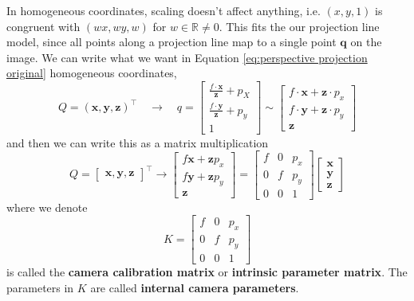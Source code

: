 \documentclass[11pt]{article}
\newcommand{\bq}{\mathbf{q}}
\newcommand{\bx}{\mathbf{x}}
\newcommand{\by}{\mathbf{y}}
\newcommand{\bz}{\mathbf{z}}
\newcommand{\real}{\mathbb{R}}
\begin{document}
In homogeneous coordinates, scaling doesn't affect anything, i.e. $(x, y, 1)$ is congruent with $(wx, wy, w)$ for $w\in\real \neq 0$. This fits the our projection line model, since all points along a projection line map to a single point $\bq$ on the image. We can write what we want in Equation \ref{eq:perspective projection original} homogeneous coordinates, 
\begin{equation}
	Q=(\bx, \by, \bz)^{\top} \quad \rightarrow \quad q=\left[\begin{array}{c}
		\frac{f \cdot \bx}{\bz} + p_{X} \\
		\frac{f \cdot \by}{\bz} + p_{y} \\
		1
		\end{array}\right] \sim\left[\begin{array}{c}
		f \cdot \bx + \bz \cdot p_{x} \\
		f \cdot \by + \bz \cdot p_{y} \\
		\bz
	\end{array}\right]
\end{equation}
and then we can write this as a matrix multiplication
\begin{equation}
	Q = \begin{bmatrix}
		\bx, \by, \bz
	\end{bmatrix}^\top \rightarrow 
	\begin{bmatrix}
		f\bx + \bz p_x \\
		f\by + \bz p_y \\
		\bz
	\end{bmatrix} = \begin{bmatrix}
		f & 0 & p_x \\
		0 & f & p_y \\
		0 & 0 & 1
	\end{bmatrix} \begin{bmatrix}
		\bx \\ \by \\ \bz
	\end{bmatrix}
\end{equation}
where we denote 
\begin{equation}
	K = \begin{bmatrix}
		f & 0 & p_x \\
		0 & f & p_y \\
		0 & 0 & 1
	\end{bmatrix}
\end{equation}
is called the \textbf{camera calibration matrix} or \textbf{intrinsic parameter matrix}. The parameters in $K$ are called \textbf{internal camera parameters}.
\end{document}
